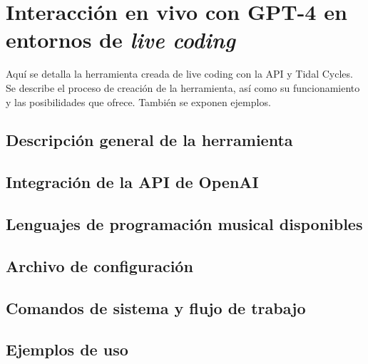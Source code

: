 \chapter{Interacción en vivo con GPT-4 en entornos de \textit{live coding}}

Aquí se detalla la herramienta creada de live coding con la API y Tidal Cycles. Se describe el proceso de creación de la herramienta, así como su funcionamiento y las posibilidades que ofrece. También se exponen ejemplos.

\section{Descripción general de la herramienta}

\section{Integración de la API de OpenAI}

\section{Lenguajes de programación musical disponibles}

\section{Archivo de configuración}

\section{Comandos de sistema y flujo de trabajo}

\section{Ejemplos de uso}